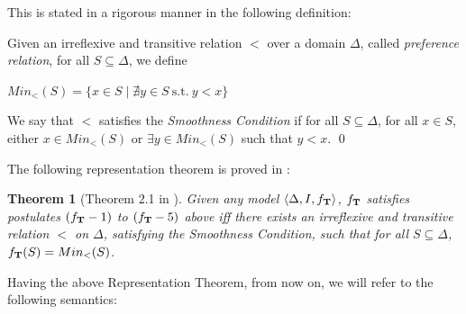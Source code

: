 \documentclass[a4paper, 11pt, oneside]{duthesis}
\newcommand{\tip}{{\bf T}}
\newcommand{\tc} {\mid}
\newenvironment{definition}
{\begin{defi} \rm}{\qed \end{defi}}
\newenvironment{definition}
{\begin{defi} \rm}{\qed \end{defi}}
\newtheorem{theorem}{Theorem}
\newtheorem{definition}{Definition}
\newcounter{posu}
\newtheorem{theorem}[posu]{Theorem}
\newtheorem{definition}[posu]{Definition}
\begin{document}
This is stated in a rigorous manner in the following definition:

\begin{definition}\label{Definition of $<$} Given an irreflexive and transitive relation  $<$ over a domain $\Delta$, called \emph{preference relation}, for all $S \subseteq \Delta$, we define

\begin{center}$Min_<(S)= \{x \in S \tc \nexists y \in S \ \mbox{s.t.} \ y < x \}$\end{center}

\noindent We say that $<$ satisfies the {\em Smoothness Condition} if for all $S \subseteq \Delta$, for all $x \in S$, either $x \in Min_<(S)$ or $\exists y \in  Min_<(S)$ such that $y < x$.
\end{definition}




\noindent The following representation theorem is proved in \cite{FI09}:

\begin{theorem}[Theorem 2.1 in \cite{FI09}]\label{rtrt} Given any model $\langle \Delta, I, f_\tip
\rangle$, $f_\tip$ satisfies postulates $(f_\tip-1)$ to $(f_\tip-5)$ above iff there exists  an irreflexive and transitive relation $<$ on $\Delta$, satisfying the Smoothness Condition, such that for all $S \subseteq \Delta$, $f_\tip(S) = Min_<(S)$.
\end{theorem}


\noindent Having the above Representation Theorem, from now on, we will refer to the following semantics:
\end{document}
